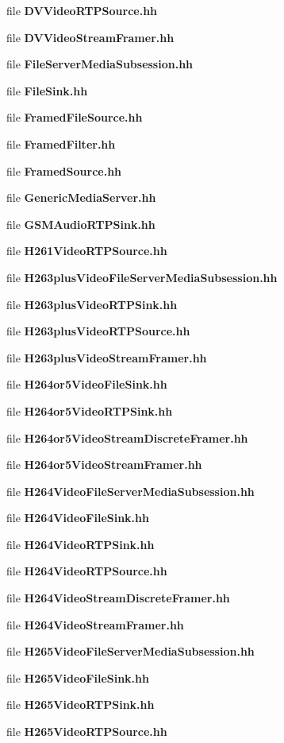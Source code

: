 \begin{DoxyCompactItemize}
\item 
file {\bf D\+V\+Video\+R\+T\+P\+Source.\+hh}
\item 
file {\bf D\+V\+Video\+Stream\+Framer.\+hh}
\item 
file {\bf File\+Server\+Media\+Subsession.\+hh}
\item 
file {\bf File\+Sink.\+hh}
\item 
file {\bf Framed\+File\+Source.\+hh}
\item 
file {\bf Framed\+Filter.\+hh}
\item 
file {\bf Framed\+Source.\+hh}
\item 
file {\bf Generic\+Media\+Server.\+hh}
\item 
file {\bf G\+S\+M\+Audio\+R\+T\+P\+Sink.\+hh}
\item 
file {\bf H261\+Video\+R\+T\+P\+Source.\+hh}
\item 
file {\bf H263plus\+Video\+File\+Server\+Media\+Subsession.\+hh}
\item 
file {\bf H263plus\+Video\+R\+T\+P\+Sink.\+hh}
\item 
file {\bf H263plus\+Video\+R\+T\+P\+Source.\+hh}
\item 
file {\bf H263plus\+Video\+Stream\+Framer.\+hh}
\item 
file {\bf H264or5\+Video\+File\+Sink.\+hh}
\item 
file {\bf H264or5\+Video\+R\+T\+P\+Sink.\+hh}
\item 
file {\bf H264or5\+Video\+Stream\+Discrete\+Framer.\+hh}
\item 
file {\bf H264or5\+Video\+Stream\+Framer.\+hh}
\item 
file {\bf H264\+Video\+File\+Server\+Media\+Subsession.\+hh}
\item 
file {\bf H264\+Video\+File\+Sink.\+hh}
\item 
file {\bf H264\+Video\+R\+T\+P\+Sink.\+hh}
\item 
file {\bf H264\+Video\+R\+T\+P\+Source.\+hh}
\item 
file {\bf H264\+Video\+Stream\+Discrete\+Framer.\+hh}
\item 
file {\bf H264\+Video\+Stream\+Framer.\+hh}
\item 
file {\bf H265\+Video\+File\+Server\+Media\+Subsession.\+hh}
\item 
file {\bf H265\+Video\+File\+Sink.\+hh}
\item 
file {\bf H265\+Video\+R\+T\+P\+Sink.\+hh}
\item 
file {\bf H265\+Video\+R\+T\+P\+Source.\+hh}
\item 

\end{DoxyCompactItemize}
